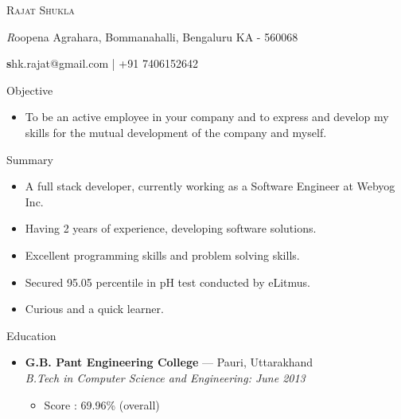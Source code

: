 \documentclass[11pt,oneside]{article}
\makeatletter
\newcommand{\name}{Rajat Shukla}
\newcommand{\addr}{Roopena Agrahara, Bommanahalli, Bengaluru KA - 560068}
\newcommand{\contact}{shk.rajat@gmail.com | +91 7406152642}
\newcommand{\bigname}[1]{
  \begin{center}\fontfamily{phv}\selectfont\Huge\scshape#1\end{center}
}
\newcommand{\bignamenew}[1]{
  \begin{center}\selectfont\Huge\scshape#1\end{center}
}
\newcommand{\addrinfo}[1]{
  \begin{center}\selectfont\small\textit#1\end{center}
}
\newcommand{\contactinfo}[1]{
  \begin{center}\selectfont\small\textbf#1\end{center}
}
\newcommand{\resdescpara}[1]{
  \vspace{-5pt}
\item
  #1
}
\newenvironment{ressection}[1]{
  \vspace{4pt}
         {\fontfamily{phv}\selectfont\Large#1}
         \begin{itemize}
           \vspace{3pt}
}{
         \end{itemize}
}
\newcommand{\resitem}[1]{
  \vspace{-4pt}
\item \begin{flushleft} #1 \end{flushleft}
}
\newcommand{\ressubitem}[1]{
  \vspace{-1pt}
\item \begin{flushleft} #1 \end{flushleft}
}
\newcommand{\resbigitem}[3]{
  \vspace{-5pt}
\item
  \textbf{#1} --- #2 \\
  \textit{#3}
}
\newenvironment{ressubsec}[3]{
  \resbigitem{#1}{#2}{#3}
  \vspace{-2pt}
  \begin{itemize}
}{
  \end{itemize}
}
\makeatother
\begin{document}



\bigname{\name}

\vspace{2 pt}
\addrinfo{\addr}

\contactinfo{\contact}
\vspace{8 pt}


\begin{ressection}{Objective}
  \resdescpara{To be an active employee in your company and to express and develop my skills for the mutual development of the company and myself.}
\end{ressection}


\begin{ressection}{Summary}
  \resitem{A full stack developer, currently working as a Software Engineer at Webyog Inc.}
  \resitem{Having 2 years of experience, developing software solutions.}
  \resitem{Excellent programming skills and problem solving skills.}
  \resitem{Secured 95.05 percentile in pH test conducted by eLitmus.}
  \resitem{Curious and a quick learner.}
\end{ressection}



\begin{ressection}{Education}
  \begin{ressubsec}{G.B. Pant Engineering College}{Pauri, Uttarakhand}{B.Tech in Computer Science and Engineering: June 2013}
    \ressubitem{Score : 69.96\% (overall)}
  \end{ressubsec}
\end{ressection}

\end{document}
